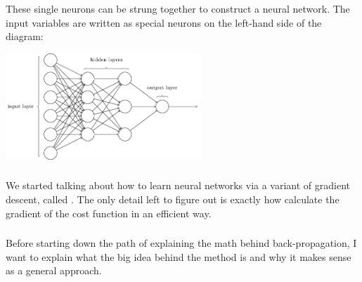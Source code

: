 \documentclass[xetex,mathserif,serif,aspectratio=169]{beamer}
\begin{document}
\begin{frame}[fragile] \frametitle{} \oldB \small


These single neurons can be strung together to construct a neural
network. The input variables are written as special neurons on the
left-hand side of the diagram:

\begin{center}
\includegraphics[height=4cm]{img/tikz11.png}
\end{center}

\end{frame}

\begin{frame}[fragile] \frametitle{} \oldB \small


We started talking about how to learn neural networks via a variant
of gradient descent, called . The
only detail left to figure out is exactly how calculate the gradient
of the cost function in an efficient way.

\end{frame}

\begin{frame}[fragile] \frametitle{} \oldB \small


Before starting down the path of explaining the math behind
back-propagation, I want to explain what the big idea behind
the method is and why it makes sense as a general approach.

\end{frame}
\end{document}
